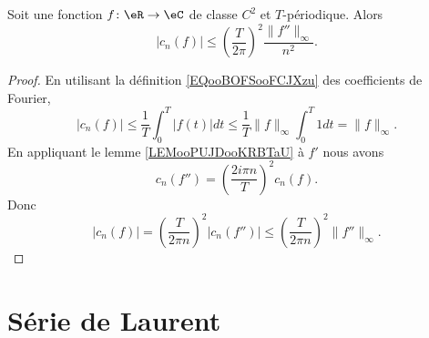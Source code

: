 \begin{lemma}     \label{LEMooYJQWooDVvSyj}
	Soit une fonction \( f\colon \eR\to \eC\) de classe \( C^2\) et \( T\)-périodique. Alors
	\begin{equation}
		| c_n(f) |\leq \left( \frac{ T }{ 2\pi } \right)^2 \frac{ \| f'' \|_{\infty} }{ n^2 }.
	\end{equation}
\end{lemma}

\begin{proof}
	En utilisant la définition \eqref{EQooBOFSooFCJXzu} des coefficients de Fourier,
	\begin{equation}
		| c_n(f) |\leq \frac{1}{ T }\int_0^T| f(t) |dt\leq \frac{ 1 }{ T }\| f \|_{\infty}\int_0^T1dt=\| f \|_{\infty}.
	\end{equation}
	En appliquant le lemme \ref{LEMooPUJDooKRBTaU} à \( f'\) nous avons
	\begin{equation}
		c_n(f'')=\left( \frac{ 2i\pi n }{ T } \right)^2c_n(f).
	\end{equation}
	Donc
	\begin{equation}
		| c_n(f) |=\left( \frac{ T }{ 2\pi n } \right)^2| c_n(f'') |\leq \left( \frac{ T }{ 2\pi n } \right)^2\| f'' \|_{\infty}.
	\end{equation}
\end{proof}

\section{Série de Laurent}

